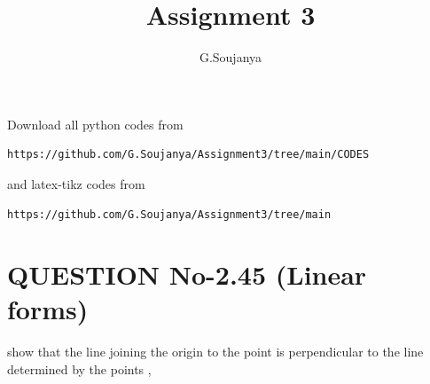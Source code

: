 \documentclass[journal,12pt,twocolumn]{IEEEtran}
\begin{document}
     \def\rightbox#1{\makebox[0in][r]{#1}}
     \def\centbox#1{\makebox[0in]{#1}}
     \def\topbox#1{\raisebox{-\baselineskip}[0in][0in]{#1}}
     \def\midbox#1{\raisebox{-0.5\baselineskip}[0in][0in]{#1}}
\vspace{3cm}
\title{Assignment 3}
\author{G.Soujanya}
\maketitle
\newpage
\bigskip
\renewcommand{\thefigure}{\theenumi}
\renewcommand{\thetable}{\theenumi}
Download all python codes from 
\begin{lstlisting}
https://github.com/G.Soujanya/Assignment3/tree/main/CODES
\end{lstlisting}
%
and latex-tikz codes from 
%
\begin{lstlisting}
https://github.com/G.Soujanya/Assignment3/tree/main
\end{lstlisting}
%
%
\section{QUESTION No-2.45 (Linear forms)}
show that the line joining the origin to the  point  is perpendicular to the line determined by the points , 
%
\end{document}
